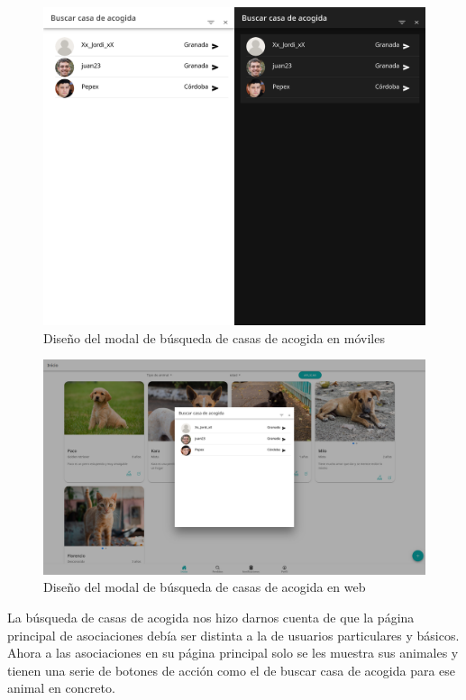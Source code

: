 \begin{figure} [H]
	\centering
	\includegraphics[width=1\linewidth]{sprint 3//hu13/implementacion.png}
	\caption{Diseño del modal de búsqueda de casas de acogida en móviles}
	\label{fig:impBusquedaAcogida}
\end{figure}

\begin{figure}[H]
	\centering
	\includegraphics[width=1\linewidth]{sprint 3//hu13/implementacionWeb.png}
	\caption{Diseño del modal de búsqueda de casas de acogida en web}
\end{figure}

La búsqueda de casas de acogida nos hizo darnos cuenta de que la página principal de asociaciones debía ser distinta a la de usuarios particulares y básicos. Ahora a las asociaciones en su página principal solo se les muestra sus animales y tienen una serie de botones de acción como el de buscar casa de acogida para ese animal en concreto.

